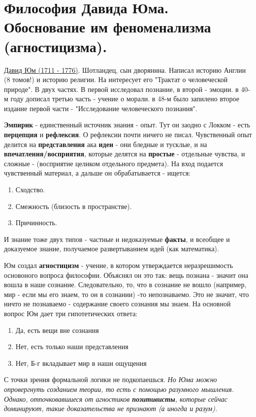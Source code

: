 \section{Философия Давида Юма. Обоснование им феноменализма (агностицизма).}
\underline{Давид Юм (1711 - 1776)}. Шотландец, сын дворянина. Написал историю Англии (8 томов!) и историю религии. На интересует его "Трактат о человеческой природе". В двух частях. В первой исследовал познание, в второй - эмоции. в 40-м году дописал третью часть - учение о морали. в 48-м было запилено второе издание первой части - "Исследование человеческого познания". 

\textbf{Эмпирик} - единственный источник знания - опыт. Тут он заодно с Локком - есть \textbf{перцепция} и \textbf{рефлексия}. О рефлексии почти ничего не писал. Чувственный опыт делится на \textbf{представления} ака \textbf{идеи} - они бледные и тусклые, и на \textbf{впечатления/восприятия}, которые делятся на \textbf{простые} - отдельные чувства, и сложные - (восприятие целиком отдельного предмета). На вход подается чувственный материал, а дальше он обрабатывается - ищется:
\begin{enumerate}
\item Сходство.
\item Смежность (близость в пространстве).
\item Причинность.
\end{enumerate}
И знание тоже двух типов - частные и недоказуемые \textbf{факты}, и всеобщее и доказуемое знание, получаемое развертыванием идей (как математика).

Юм создал \textbf{агностицизм} - учение, в котором утверждается неразрешимость основоного вопроса философии. Объяснял он это так: вещь познана - значит она вошла в наше сознание. Следовательно, то, что в сознание не вошло (например, мир - если мы его знаем, то он в сознании)  -то непознаваемо. Это не значит, что ничто не познаваемо - содержание своего сознания мы знаем. На основной вопрос Юм дает три гипотетических ответа:
\begin{enumerate}
\item Да, есть вещи вне сознания
\item Нет, есть только наши представления
\item Нет, Б-г вкладывает мир в наши ощущения
\end{enumerate}
С точки зрения формальной логики не подкопаешься. \textit{Но Юма можно опровергнуть созданием теории, то есть с помощью разумного мышления. Однако, отпочковавшиеся от агностиков \textbf{позитивисты}, которые сейчас доминируют, такие доказательства не признают (а иногда и разум).}

